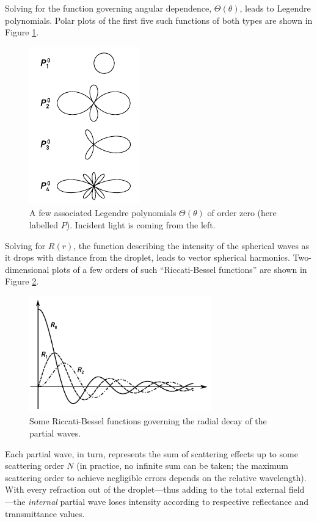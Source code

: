 \documentclass[11.5pt,oneside]{book}
\begin{document}
Solving for the function governing angular dependence, $\Theta(\theta)$, leads
to Legendre polynomials. Polar plots of the first five such functions of
both types are shown in Figure \ref{fig:angularfuncs}. 

\begin{figure}
    \centering
    \includegraphics[height=0.5\textheight]{img/scattering/radials.pdf}
    \caption{A few associated Legendre polynomials $\Theta(\theta)$ of order zero (here labelled $P$). Incident light is coming from the
    left.}
    \label{fig:angularfuncs}
\end{figure}

Solving for $R(r)$, the function describing the intensity of the spherical waves
as it drops with distance from the droplet, leads to vector spherical harmonics.
Two-dimensional plots of a few orders of such ``Riccati-Bessel functions'' are
shown in Figure \ref{fig:besselfuncs}.

\begin{figure}
    \centering
    \includegraphics[width=0.7\textwidth]{img/scattering/bessel.pdf}
    \caption{Some Riccati-Bessel functions governing the radial decay of the partial
    waves.}
    \label{fig:besselfuncs}
\end{figure}

Each partial wave, in turn, represents the sum of scattering effects up to some
scattering order $N$ (in practice, no infinite sum can be taken; the maximum
scattering order to achieve negligible errors depends on the relative
wavelength). With every refraction out of the droplet---thus adding to the
total external field---the \emph{internal} partial wave loses intensity
according to respective reflectance and transmittance values.
\end{document}
